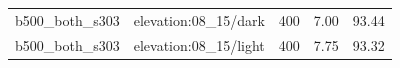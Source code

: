 \begin{longtable}{l>{\raggedright\arraybackslash}p{.42\linewidth}rrr}
b500\_\allowbreak{}both\_\allowbreak{}s303 & %
elevation:08\_\allowbreak{}15/dark & %
400 & %
7.00 & %
93.44 \\ %

b500\_\allowbreak{}both\_\allowbreak{}s303 & %
elevation:08\_\allowbreak{}15/light & %
400 & %
7.75 & %
93.32 \\ %


\end{longtable}
